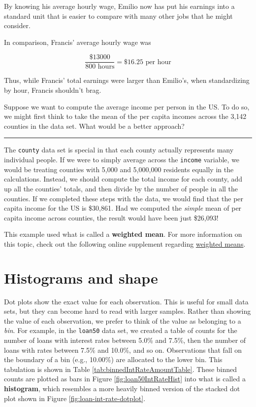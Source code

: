 \documentclass[
  10pt,
  openany]{book}
\theoremstyle{definition}
\theoremstyle{definition}
\theoremstyle{definition}
\theoremstyle{definition}
\theoremstyle{remark}
\begin{document}
By knowing his average hourly wage,
Emilio now has put his earnings into a standard unit that is easier to compare with many other jobs that he might consider.

In comparison, Francis' average hourly wage was

\[ \frac{\$13000}{800\text{ hours}} = \$16.25\text{ per hour} \]

Thus, while Francis' total earnings were larger than Emilio's, when standardizing by hour, Francis shouldn't brag.

Suppose we want to compute the average income per person in the US. To do so, we might first think to take the mean of the per capita incomes across the 3,142 counties in the  data set. What would be a better approach?

\begin{center}\rule{0.5\linewidth}{0.5pt}\end{center}

The \texttt{county} data set is special in that each county actually represents many individual people.
If we were to simply average across the \texttt{income} variable, we would be treating counties with 5,000 and 5,000,000 residents equally in the calculations.
Instead, we should compute the total income for each county, add up all the counties' totals, and then divide by the number of people in all the counties.
If we completed these steps with the  data, we would find that the per capita income for the US is \$30,861.
Had we computed the \emph{simple} mean of per capita income across counties, the result would have been just \$26,093!

This example used what is called a \textbf{weighted mean}.
For more information on this topic, check out the following online supplement regarding \href{https://www.openintro.org/go/?id=stat_extra_weighted_mean}{weighted means}.

\section{Histograms and shape}\label{histograms}

Dot plots show the exact value for each observation. This is useful for small data sets, but they can become hard to read with larger samples. Rather than showing the value of each observation, we prefer to think of the value as belonging to a \emph{bin}. For example, in the \texttt{loan50} data set, we created a table of counts for the number of loans with interest rates between 5.0\% and 7.5\%, then the number of loans with rates between 7.5\% and 10.0\%, and so on. Observations that fall on the boundary of a bin (e.g., 10.00\%) are allocated to the lower bin. This tabulation is shown in Table \ref{tab:binnedIntRateAmountTable}. These binned counts are plotted as bars in Figure \ref{fig:loan50IntRateHist} into what is called a \textbf{histogram}, which resembles a more heavily binned version of the stacked dot plot shown in Figure \ref{fig:loan-int-rate-dotplot}.
\end{document}
